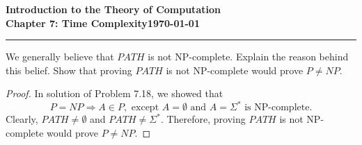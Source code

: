 \documentclass[11pt]{article}
\newcommand{\dated}{\today}
\begin{document}
\textbf{Introduction to the Theory of
Computation}\hfill\textbf{\myname}\\[0.01in]
\textbf{Chapter 7: Time Complexity}\hfill\textbf{\dated}\\
\smallskip\hrule\bigskip

\begin{problem}{7.20}
We generally believe that $PATH$ is not NP-complete. Explain the reason behind this belief. Show that proving $PATH$ is not NP-complete would prove $P \neq NP$.
\end{problem}

\begin{proof}
In solution of Problem 7.18, we showed that
\[
P = NP \Rightarrow A \in P, \text{ except } A = \emptyset \text{ and } A = \Sigma^{*} \text{ is NP-complete}.
\]
Clearly, $PATH \neq \emptyset$ and $PATH \neq \Sigma^{*}$. Therefore, proving $PATH$ is not NP-complete would prove $P \neq NP$.
\end{proof}
\end{document}
